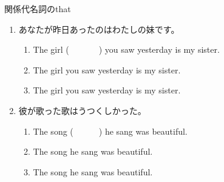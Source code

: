 \documentclass[aspectratio=169,xcolor={dvipsnames,table}]{beamer}
\begin{document}
\begin{frame}[plain]{関係代名詞のthat}
 \begin{enumerate}
  \item<1-> あなたが昨日あったのはわたしの妹です。%
\mbox{}\hfill{\scriptsize {}}
       \begin{enumerate}
	\item<1-> The girl (~~~~~~~) you saw yesterday is my sister.
	\item<2->  The girl  you saw yesterday is my sister.
	\item<5->  The girl  you saw yesterday is my sister.
	\end{enumerate}
  \item<1-> 彼が歌った歌はうつくしかった。
	\begin{enumerate}
	 \item<1-> The song (~~~~~~) he sang was beautiful.
	 \item<3-> The song  he sang was beautiful.
	 \item<6-> The song  he sang was beautiful.
       \end{enumerate}
 \end{enumerate}

\end{frame}
\end{document}
